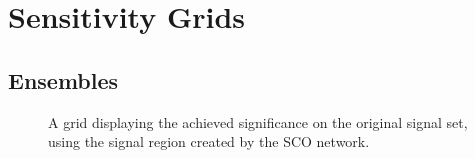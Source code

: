 \section{Sensitivity Grids}\label{sec: Sensitivity}
\subsection{Ensembles}

\begin{figure}
    \caption{A grid displaying the achieved significance on the original signal set, using the signal region 
    created by the \ac{SCO} network.}
    \label{fig:StochChannelOutGridSig}
\end{figure}
